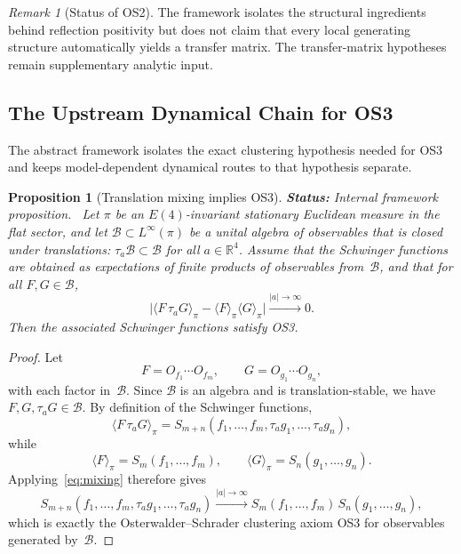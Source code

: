 \documentclass[12pt,a4paper]{article}
\theoremstyle{plain}
\newtheorem{proposition}[theorem]{Proposition}
\theoremstyle{definition}
\theoremstyle{remark}
\newtheorem{remark}[theorem]{Remark}
\newcommand{\real}{\mathbb{R}}
\newcommand{\status}[1]{\textnormal{\textbf{Status:} #1.}\ }
\begin{document}
\begin{remark}[Status of OS2]
  The framework isolates the structural ingredients behind reflection
  positivity but does not claim that every local generating structure
  automatically yields a transfer matrix. The transfer-matrix
  hypotheses remain supplementary analytic input.
\end{remark}


\subsection{The Upstream Dynamical Chain for OS3}

The abstract framework isolates the exact clustering hypothesis needed
for OS3 and keeps model-dependent dynamical routes to that hypothesis
separate.

\begin{proposition}[Translation mixing implies OS3]\label{prop:mixing}
  \status{Internal framework proposition}
  Let $\pi$ be an $E(4)$-invariant stationary Euclidean measure in the
  flat sector, and let $\mathcal{B} \subset L^\infty(\pi)$ be a
  unital algebra of observables that is closed under translations:
  $\tau_a \mathcal{B} \subset \mathcal{B}$ for all
  $a \in \real^4$. Assume that the Schwinger functions are obtained as
  expectations of finite products of observables from~$\mathcal{B}$,
  and that for all $F, G \in \mathcal{B}$,
  \begin{equation}\label{eq:mixing}
    \big|\langle F \, \tau_a G\rangle_\pi
    - \langle F\rangle_\pi \langle G\rangle_\pi\big|
    \xrightarrow{|a| \to \infty} 0.
  \end{equation}
  Then the associated Schwinger functions satisfy OS3.
\end{proposition}
\begin{proof}
  Let
  \[
    F = O_{f_1}\cdots O_{f_m},
    \qquad
    G = O_{g_1}\cdots O_{g_n},
  \]
  with each factor in~$\mathcal{B}$. Since $\mathcal{B}$ is an algebra
  and is translation-stable, we have $F, G, \tau_a G \in \mathcal{B}$.
  By definition of the Schwinger functions,
  \[
    \langle F \, \tau_a G\rangle_\pi
    = S_{m+n}(f_1,\ldots,f_m,\tau_a g_1,\ldots,\tau_a g_n),
  \]
  while
  \[
    \langle F\rangle_\pi = S_m(f_1,\ldots,f_m),
    \qquad
    \langle G\rangle_\pi = S_n(g_1,\ldots,g_n).
  \]
  Applying~\eqref{eq:mixing} therefore gives
  \[
    S_{m+n}(f_1,\ldots,f_m,\tau_a g_1,\ldots,\tau_a g_n)
    \xrightarrow{|a|\to\infty}
    S_m(f_1,\ldots,f_m)\, S_n(g_1,\ldots,g_n),
  \]
  which is exactly the Osterwalder--Schrader clustering axiom OS3 for
  observables generated by~$\mathcal{B}$.
\end{proof}
\end{document}
